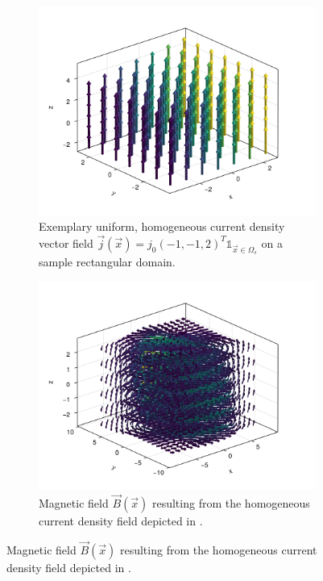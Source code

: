 \documentclass[12pt]{article}
\begin{document}
  \begin{figure}[H]
    \centering
    \begin{subfigure}[t]{0.48\textwidth}
      \centering
      \includegraphics[width=\textwidth]{../figures/homo-cdp-j-field.pdf}
      \caption{Exemplary uniform, homogeneous current density vector field $\vec{j}(\vec{x}) = {j}_0 (-1, -1, 2)^T \mathds{1}_{\vec{x} \in \Omega_s}$ on a sample rectangular domain.}
      \label{fig:demo-cdp-j-field}
    \end{subfigure}
    \hfill
    \begin{subfigure}[t]{0.48\textwidth}
      \centering
      \includegraphics[width=\textwidth]{../figures/homo-cdp-b-field.pdf}
      \caption{Magnetic field $\vec{B}(\vec{x})$ resulting from the homogeneous current density field depicted in .}
      \label{fig:demo-cdp-b-field}
    \end{subfigure}
  \end{figure}
\end{document}
